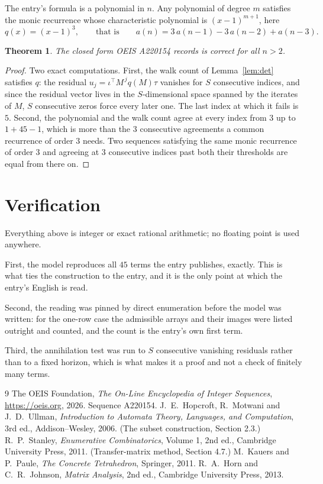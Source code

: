 \documentclass[11pt,a4paper]{article}
\theoremstyle{plain}
\newtheorem{theorem}{Theorem}
\theoremstyle{definition}
\begin{document}
The entry's formula is a polynomial in $n$. Any polynomial of degree $m$ satisfies the monic
recurrence whose characteristic polynomial is $(x-1)^{m+1}$, here
\[
q(x)=(x-1)^{3},\qquad\text{that is}\qquad a(n)=3\,a(n-1) - 3\,a(n-2) + a(n-3).
\]

\begin{theorem}
The closed form OEIS A220154 records is correct for all $n>2$.
\end{theorem}

\begin{proof}
Two exact computations. First, the walk count of Lemma~\ref{lem:det} satisfies $q$: the
residual $u_j=\iota^{\!\top}M^{\,j}q(M)\tau$ vanishes for $S$ consecutive indices, and
since the residual vector lives in the $S$-dimensional space spanned by the iterates of $M$,
$S$ consecutive zeros force every later one. The last index at which it fails is $5$.
Second, the polynomial and the walk count agree at every index from $3$ up to
$1 + 45 - 1$, which is more than the $3$ consecutive agreements a
common recurrence of order $3$ needs. Two sequences satisfying the same monic recurrence
of order $3$ and agreeing at $3$ consecutive indices past both their thresholds are
equal from there on.
\end{proof}

\section{Verification}

Everything above is integer or exact rational arithmetic; no floating point is used anywhere.

First, the model reproduces all $45$ terms the entry publishes, exactly. This is what
ties the construction to the entry, and it is the only point at which the entry's English is
read.

Second, the reading was pinned by direct enumeration before the model was written: for the
one-row case the admissible arrays and their images were listed outright and counted, and the
count is the entry's own first term.

Third, the annihilation test was run to $S$ consecutive vanishing residuals rather than to a
fixed horizon, which is what makes it a proof and not a check of finitely many terms.

\begin{thebibliography}{9}
 The OEIS Foundation, \emph{The On-Line Encyclopedia of Integer
Sequences}, \url{https://oeis.org}, 2026. Sequence A220154.
 J.~E.~Hopcroft, R.~Motwani and J.~D.~Ullman, \emph{Introduction to Automata
Theory, Languages, and Computation}, 3rd ed., Addison--Wesley, 2006. (The subset
construction, Section 2.3.)
 R.~P.~Stanley, \emph{Enumerative Combinatorics}, Volume 1, 2nd ed.,
Cambridge University Press, 2011. (Transfer-matrix method, Section 4.7.)
 M.~Kauers and P.~Paule, \emph{The Concrete Tetrahedron}, Springer, 2011.
 R.~A.~Horn and C.~R.~Johnson, \emph{Matrix Analysis}, 2nd ed., Cambridge
University Press, 2013.
\end{thebibliography}
\end{document}
